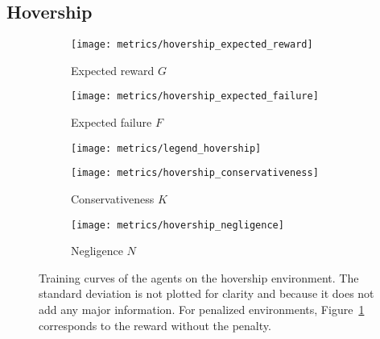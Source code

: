 \subsection{Hovership}


\begin{figure}[t]
	\centering
	\begin{subfigure}{0.39\textwidth}
		\centering
		\texttt{[image: metrics/hovership\_expected\_reward]}
		\caption{Expected reward $G$}
		\label{fig:results:hovership:expected reward}
	\end{subfigure}
	\begin{subfigure}{0.39\textwidth}
		\centering
		\texttt{[image: metrics/hovership\_expected\_failure]}
		\caption{Expected failure $F$}
		\label{fig:results:hovership:expected failure}
	\end{subfigure}
	\begin{subfigure}{0.2\textwidth}
		\centering
		\texttt{[image: metrics/legend\_hovership]}
	\end{subfigure}
	\newline
	\begin{subfigure}{0.39\textwidth}
		\centering
		\texttt{[image: metrics/hovership\_conservativeness]}
		\caption{Conservativeness $K$}
		\label{fig:results:hovership:conservativeness}
	\end{subfigure}
	\begin{subfigure}{0.39\textwidth}
		\centering
		\texttt{[image: metrics/hovership\_negligence]}
		\caption{Negligence $N$}
		\label{fig:results:hovership:negligence}
	\end{subfigure}
	\begin{subfigure}{0.2\textwidth}
		\hfill
	\end{subfigure}
	\caption{Training curves of the agents on the hovership environment. The standard deviation is not plotted for clarity and because it does not add any major information. For penalized environments, Figure~\ref{fig:results:hovership:expected reward} corresponds to the reward without the penalty.}
	\label{fig:results:hovership}
\end{figure}

